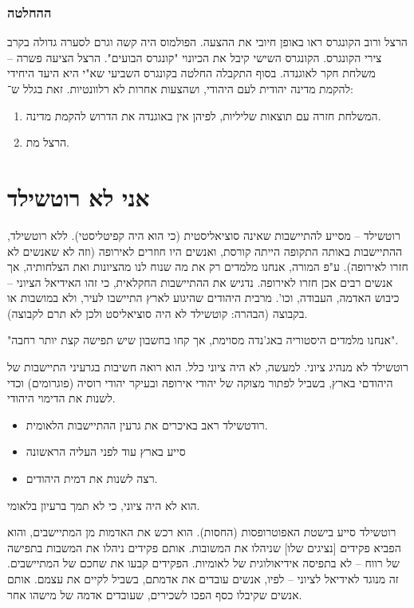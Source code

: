 \documentclass[a4paper]{book}
\begin{document}
	\subsubsection{ההחלטה}
	הרצל ורוב הקונגרס ראו באופן חיובי את ההצעה. הפולמוס היה קשה וגרם לסערה גדולה בקרב צירי הקונגרס. הקונגרס השישי קיבל את הכיונוי "קונגרס הבועים". הרצל הציעה פשרה – משלחת חקר לאוגנדה. בסוף התקבלה החלטה בקונגרס השביעי שא"י היא היעד היחידי להקמת מדינה יהודית לעם היהודי, ושהצעות אחרות לא רלוונטיות. זאת בגלל ש־: 
	\begin{enumerate}
		\item המשלחת חזרה עם תוצאות שליליות, לפיהן אין באוגנדה את הדרוש להקמת מדינה. 
		\item הרצל מת. 
	\end{enumerate}
	
	\section{אני לא רוטשילד}
	רוטשילד – מסייע להתיישבות שאינה סוציאליסטית (כי הוא היה קפיטליסטי). ללא רוטשילד, ההתיישבות באותה התקופה הייתה קורסת, ואנשים היו חוזרים לאירופה (וזה לא שאנשים לא חזרו לאירופה). ע"פ המורה, אנחנו מלמדים רק את מה שנוח לנו מהציונות ואת הצלחותיה, אך אנשים רבים אכן חזרו לאירופה. נדגיש את ההתיישבות החקלאית, כי זהו האידיאל הציוני – כיבוש האדמה, העבודה, וכו'. מרבית היהודים שהיגוע לארץ התיישבו לעיר, ולא במושבות או בקבוצה (הבהרה: קוטשילד לא היה סוציאליסט ולכן לא תרם לקבוצה). 
	
	"אנחנו מלמדים היסטוריה באג'נדה מסוימת, אך קחו בחשבון שיש תפישה קצת יותר רחבה". 
	
	רוטשילד לא מנהיג ציוני. למעשה, לא היה ציוני כלל. הוא רואה חשיבות בגרעיני התיישבות של היהודםי בארץ, בשביל לפתור מצוקה של יהודי אירופה ובעיקר יהודי רוסיה (פוגרומים) וכדי לשנות את הדימוי היהודי. 
	\begin{itemize}
		\item רודטשילד ראב באיכרים את גרעין ההתיישבות הלאומית. 
		\item סייע בארץ עוד לפני העליה הראשונה
		\item רצה לשנות את דמית היהודים. 
	\end{itemize}
	הוא לא היה ציוני, כי לא תמך ברעיון בלאומי. 
	
	רוטשילד סייע בישטת האפוטרופסות (החסות). הוא רכש את האדמות מן המתיישבים, והוא הפביא פקידים [נציגים שלו] שניהלו את המשובות. אותם פקידים ניהלו את המשבות בתפישה של רווח – לא בתפיסה אידיאולוגית של לאומיות. הפקידים קבעו את שחכם של המתיישבים. זה מנוגד לאידיאל לציוני – לפיו, אנשים עובדים את אדמתם, בשביל לקיים את עצמם. אותם אנשים שקיבלו כסף הפכו לשכירים, שעובדים אדמה של מישהו אחר. 
	
\end{document}

